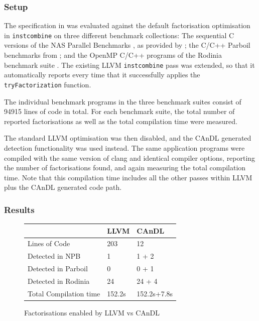 \subsubsection{Setup}

    The specification in  was evaluated against the default
    factorisation optimisation in \texttt{instcombine} on three different
    benchmark collections:
    The sequential C versions of the NAS Parallel Benchmarks
    \citep{Bailey1991NPB}, as provided by \citet{seo2011performance};
    the C/C++ Parboil benchmarks from \citet{stratton2012parboil};
    and the OpenMP C/C++ programs of the Rodinia benchmark suite
    \citep{Che2009Rodinia}.
    The existing LLVM \texttt{instcombine} pass was extended, so that it
    automatically reports every time that it successfully applies the
    \texttt{tryFactorization} function.  

    The individual benchmark programs in the three benchmark
    suites consist of 94915 lines of code in total.
    For each benchmark suite, the total number of reported factorisations as
    well as the total compilation time were measured.

    The standard LLVM optimisation was then disabled, and the CAnDL generated
    detection functionality was used instead.
    The same application programs were compiled with the same version of clang
    and identical compiler options, reporting the number of factorisations
    found, and again measuring the total compilation time.
    Note that this compilation time includes all the other passes within LLVM
    plus the CAnDL generated code path.

\subsubsection{Results}

\begin{figure}[t]
\centering
\begin{tabular}{|l||l|l|}
\hline
         & LLVM  &CAnDL \\
\hline
\hline
Lines of Code & 203 & 12 \\
\hline
Detected in NPB & 1 & 1 + 2 \\
Detected in Parboil & 0 & 0 + 1\\
Detected in Rodinia & 24 & 24 + 4\\
\hline
Total Compilation time & 152.2s & 152.2s+7.8s \\
\hline
\end{tabular}
\caption{Factorisations enabled by LLVM vs CAnDL}
\label{fig:factorization_results}
\end{figure}


